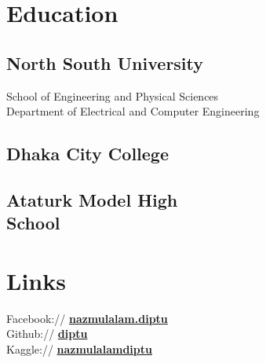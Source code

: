 \documentclass[]{deedy-resume-openfont}
\begin{document}
\begin{minipage}[t]{0.33\textwidth} 


\section{Education} 


\subsection{North South University}
School of Engineering and Physical Sciences \\
Department of Electrical and Computer Engineering
\sectionsep

\subsection{Dhaka City College}
\sectionsep

\subsection{Ataturk Model High \\
School}
\sectionsep


\section{Links} 
Facebook:// \href{https://facebook/nazmulalam.diptu}{\bf nazmulalam.diptu} \\
Github:// \href{https://github.com/diptu}{\bf diptu} \\
Kaggle://  \href{https://www.kaggle.com/nazmulalamdiptu}{\bf nazmulalamdiptu} 


\end{minipage}
\end{document}
